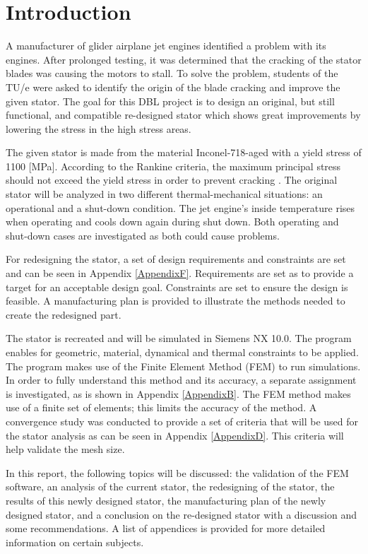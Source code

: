 \section*{Introduction}
\label{introduction}
A manufacturer of glider airplane jet engines identified a problem with its engines. After prolonged testing, it was determined that the cracking of the stator blades was causing the motors to stall. To solve the problem, students of the TU/e were asked to identify the origin of the blade cracking and improve the given stator. The goal for this DBL project is to design an original, but still functional, and compatible re-designed stator which shows great improvements by lowering the stress in the high stress areas.

The given stator is made from the material Inconel-718-aged with a yield stress of 1100 [MPa]. According to the Rankine criteria, the maximum principal stress should not exceed the yield stress in order to prevent cracking \cite{Solidmechanics}. The original stator will be analyzed in two different thermal-mechanical situations: an operational and a shut-down condition. The jet engine's inside temperature rises when operating and cools down again during shut down. Both operating and shut-down cases are investigated as both could cause problems.

For redesigning the stator, a set of design requirements and constraints are set and can be seen in Appendix \ref{AppendixF}. Requirements are set as to provide a target for an acceptable design goal. Constraints are set to ensure the design is feasible. A manufacturing plan is provided to illustrate the methods needed to create the redesigned part. 

The stator is recreated and will be simulated in Siemens NX 10.0. The program enables for geometric, material, dynamical and thermal constraints to be applied. The program makes use of the Finite Element Method (FEM) to run simulations. In order to fully understand this method and its accuracy, a separate assignment is investigated, as is shown in Appendix \ref{AppendixB}. The FEM method makes use of a finite set of elements; this limits the accuracy of the method. A convergence study was conducted to provide a set of criteria that will be used for the stator analysis as can be seen in Appendix \ref{AppendixD}. This criteria will help validate the mesh size. 

In this report, the following topics will be discussed: the validation of the FEM software, an analysis of the current stator, the redesigning of the stator, the results of this newly designed stator, the manufacturing plan of the newly designed stator, and a conclusion on the re-designed stator with a discussion and some recommendations. A list of appendices is provided for more detailed information on certain subjects.
\newpage